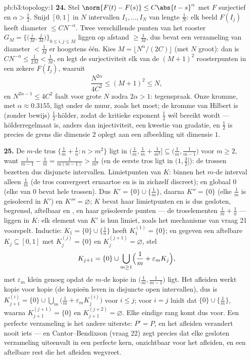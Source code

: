 \begin{solution}{pb:b3:topology:1}
\textbf{24.} Stel $\norm{F(t) - F(s)} \leq C\abs{t-s}^\alpha$ met
$F$ surjectief en $\alpha > \frac12$. Snijd $[0,1]$ in $N$
intervallen $I_1, \dots, I_N$ van lengte $\frac1N$: elk beeld
$F(I_j)$ heeft diameter $\leq CN^{-\alpha}$. Twee verschillende
punten van het rooster $G_M = \bigl\{\bigl(\frac iM, \frac
jM\bigr)\bigr\}_{0 \leq i, j \leq M}$ liggen op afstand $\geq
\frac1M$, dus bevat een verzameling van diameter $< \frac1M$ er
hoogstens één. Kies $M = \lfloor N^\alpha/(2C)\rfloor$ (met $N$
groot): dan is $CN^{-\alpha} \leq \frac1{2M} < \frac1M$, en legt
de surjectiviteit elk van de $(M+1)^2$ roosterpunten in een zekere
$F(I_j)$, waaruit
\[
\frac{N^{2\alpha}}{4C^2} \leq (M + 1)^2 \leq N,
\]
en $N^{2\alpha - 1} \leq 4C^2$ faalt voor grote $N$ zodra
$2\alpha > 1$: tegenspraak. Onze kromme, met $\alpha \approx
0.3155$, ligt onder de muur, zoals het moet; de kromme van Hilbert
is (zonder bewijs) $\frac12$-hölder, zodat de kritieke exponent
$\frac12$ wél bereikt wordt --- hölderregelmaat is, anders dan
injectiviteit, een kwestie van gradatie, en $\frac12$ is precies
de grens die dimensie $2$ oplegt aan een afbeelding uit dimensie
$1$.

\textbf{25.} De $m$-de tros $\{\frac1m + \frac1n : n > m^2\}$ ligt
in $\bigl(\frac1m, \frac1m + \frac1{m^2}\bigr] \subseteq
\bigl(\frac1m, \frac1{m-1}\bigr)$ voor $m \geq 2$, want
$\frac1{m-1} - \frac1m = \frac1{m(m-1)} > \frac1{m^2}$ (en de
eerste tros ligt in $(1, \frac32]$): de trossen bezetten dus
disjuncte intervallen. Limietpunten van $K$: binnen het $m$-de
interval alleen $\frac1m$ (de tros convergeert ernaartoe en is in
zichzelf discreet); en globaal $0$ (elke  van $0$ bevat
hele trossen). Dus $K' = \{0\} \cup \{\frac1m\}$, daarna $K'' =
\{0\}$ (elke $\frac1m$ is geïsoleerd in $K'$) en $K''' =
\varnothing$; $K$ bevat haar limietpunten en is dus gesloten,
begrensd, aftelbaar en , en haar geïsoleerde punten --- de
troselementen $\frac1m + \frac1n$ --- liggen  in $K$: elk
element van $K'$ is hun limiet, zoals het mechanisme van vraag 21
voorspelt. Inductie: $K_1 = \{0\}\cup\{\frac1n\}$ heeft
$K_1^{(1)} = \{0\}$; en gegeven een aftelbare  $K_j
\subseteq [0, 1]$ met $K_j^{(j)} = \{0\}$ en $K_j^{(j+1)} =
\varnothing$, stel
\[
K_{j+1} = \{0\} \cup \bigcup_{m \geq 1}
\Bigl(\frac1m + \varepsilon_m K_j\Bigr),
\]
met $\varepsilon_m$ klein genoeg opdat de $m$-de kopie in
$\bigl(\frac1m, \frac1{m-1}\bigr)$ ligt. Het afleiden werkt kopie
voor kopie (de kopieën leven in disjuncte open intervallen), dus
is $K_{j+1}^{(i)} = \{0\} \cup \bigcup_m\bigl(\frac1m +
\varepsilon_mK_j^{(i)}\bigr)$ voor $i \leq j$; voor $i = j$ luidt
dat $\{0\} \cup \{\frac1m\}$, waarna $K_{j+1}^{(j+1)} = \{0\}$ en
$K_{j+1}^{(j+2)} = \varnothing$. Elke eindige rang komt dus voor.
Een perfecte verzameling is het andere uiterste: $P' = P$, en het
afleiden verandert nooit iets --- en Cantor--Bendixson (vraag 22)
zegt precies dat elke gesloten verzameling uiteenvalt in een
perfecte kern, onzichtbaar voor het afleiden, en een aftelbare
rest die het afleiden wegvreet.
\end{solution}
